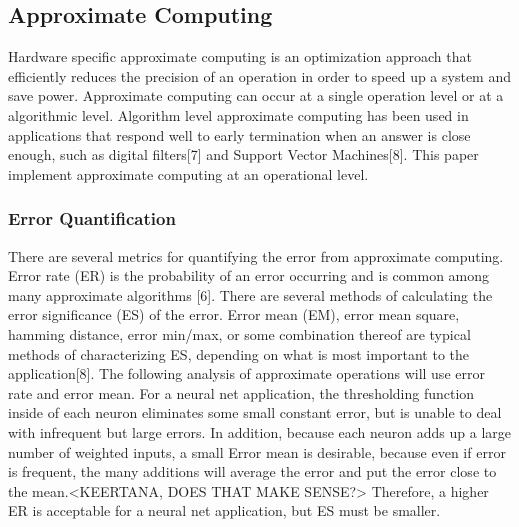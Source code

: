 \documentclass[journal]{IEEEtran}
\begin{document}
\subsection{Approximate Computing}

	\indent Hardware specific approximate computing is an optimization approach that efficiently reduces the precision of an operation in order to speed up a system and save power. Approximate computing can occur at a single operation level or at a algorithmic level. Algorithm level approximate computing has been used in applications that respond well to early termination when an answer is close enough, such as digital filters[7] and Support Vector Machines[8]. This paper implement approximate computing at an operational level.\\
	

	\subsubsection{Error Quantification}
	\indent 	There are several metrics for quantifying the error from approximate computing. Error rate (ER) is the probability of an error occurring and is common among many approximate algorithms [6]. There are several methods of calculating the error significance (ES) of the error. Error mean (EM), error mean square, hamming distance, error min/max, or some combination thereof are typical methods of characterizing ES, depending on what is most important to the application[8]. The following analysis of approximate operations will use error rate and error mean. For a neural net application, the thresholding function inside of each neuron eliminates some small constant error, but is unable to deal with infrequent but large errors. In addition, because each neuron adds up a large number of weighted inputs, a small Error mean is desirable, because even if error is frequent, the many additions will average the error and put the error close to the mean.<KEERTANA, DOES THAT MAKE SENSE?>  Therefore, a higher ER is acceptable for a neural net application, but ES must be smaller. \\	
	
\end{document}
